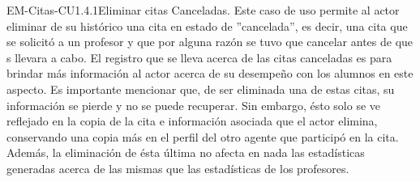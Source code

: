 \begin{UseCase}{EM-Citas-CU1.4.1}{Eliminar citas Canceladas.}
	{
	\noindent
	Este caso de uso permite al actor eliminar de su histórico una cita en estado de ''cancelada'', es decir, una cita que se solicitó a un profesor y que por alguna razón se tuvo que cancelar antes de que s llevara a cabo. El registro que se lleva acerca de las citas canceladas es para brindar más información al actor acerca de su desempeño con los alumnos en este aspecto.
	\newline
	Es importante mencionar que, de ser eliminada una de estas citas, su información se pierde y no se puede recuperar. Sin embargo, ésto solo se ve reflejado en la copia de la cita e información asociada que el actor elimina, conservando una copia más en el perfil del otro agente que participó en la cita. Además, la eliminación de ésta última no afecta en nada las estadísticas generadas acerca de las mismas que las estadísticas de los profesores.
	\newline
	}
\end{UseCase}

